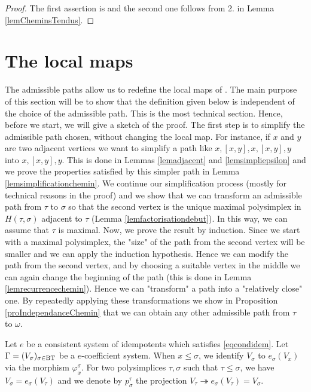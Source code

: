 \documentclass[a4paper,10pt]{amsart}
\begin{document}
\begin{proof}
The first assertion is \cite[Lem. 2.15]{meyer_resolutions_2010} and the second one follows from 2. in Lemma \ref{lemCheminsTendus}.
\end{proof}


\section{The local maps}
\label{secapplocales}


The admissible paths allow us to redefine the local maps of \cite{Wanga}. The main purpose of this section will be to show that the definition given below is independent of the choice of the admissible path. This is the most technical section. Hence, before we start, we will give a sketch of the proof. The first step is to simplify the admissible path chosen, without changing the local map. For instance, if $x$ and $y$ are two adjacent vertices we want to simplify a path like $x,[x,y],x,[x,y],y$ into $x,[x,y],y$. This is done in Lemmas \ref{lemadjacent} and \ref{lemsimpliepsilon} and we prove the properties satisfied by this simpler path in Lemma \ref{lemsimplificationchemin}. We continue our simplification process (mostly for technical reasons in the proof) and we show that we can transform an admissible path from $\tau$ to $\sigma$ so that the second vertex is the unique maximal polysimplex in $H(\tau,\sigma)$ adjacent to $\tau$ (Lemma \ref{lemfactorisationdebut}). In this way, we can assume that $\tau$ is maximal. Now, we prove the result by induction. Since we start with a maximal polysimplex, the "size" of the path from the second vertex will be smaller and we can apply the induction hypothesis. Hence we can modify the path from the second vertex, and by choosing a suitable vertex in the middle we can again change the beginning of the path (this is done in Lemma \ref{lemrecurrencechemin}). Hence we can "transform" a path into a "relatively close" one. By repeatedly applying these transformations we show in Proposition \ref{proIndependanceChemin} that we can obtain any other admissible path from $\tau$ to $\omega$.


\bigskip

Let $e$ be a consistent system of idempotents which satisfies \eqref{eqcondidem}. Let $\Gamma=(V_{\sigma})_{\sigma \in \bt}$ be a $e$-coefficient system. When $x \leq \sigma$, we identify $V_{\sigma}$ to $e_{\sigma}(V_{x})$ via the morphism $\varphi_{x}^{\sigma}$. For two polysimplices $\tau,\sigma$ such that $\tau \leq \sigma$, we have $V_{\sigma}=e_{\sigma}(V_{\tau})$ and we denote by $p_{\sigma}^{\tau}$ the projection $V_{\tau} \twoheadrightarrow e_{\sigma}(V_{\tau})=V_{\sigma}$.
\end{document}
